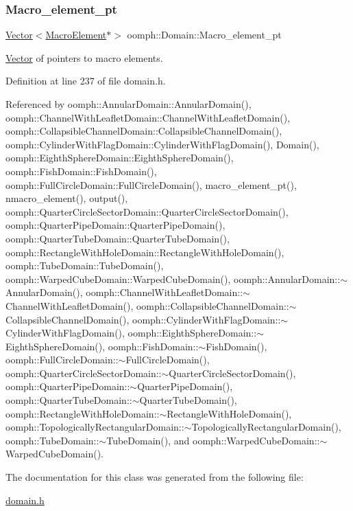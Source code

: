 \subsubsection{\texorpdfstring{Macro\+\_\+element\+\_\+pt}{Macro\_element\_pt}}
{\footnotesize\ttfamily \hyperlink{classoomph_1_1Vector}{Vector}$<$\hyperlink{classoomph_1_1MacroElement}{Macro\+Element}$\ast$$>$ oomph\+::\+Domain\+::\+Macro\+\_\+element\+\_\+pt\hspace{0.3cm}{\ttfamily [protected]}}



\hyperlink{classoomph_1_1Vector}{Vector} of pointers to macro elements. 



Definition at line 237 of file domain.\+h.



Referenced by oomph\+::\+Annular\+Domain\+::\+Annular\+Domain(), oomph\+::\+Channel\+With\+Leaflet\+Domain\+::\+Channel\+With\+Leaflet\+Domain(), oomph\+::\+Collapsible\+Channel\+Domain\+::\+Collapsible\+Channel\+Domain(), oomph\+::\+Cylinder\+With\+Flag\+Domain\+::\+Cylinder\+With\+Flag\+Domain(), Domain(), oomph\+::\+Eighth\+Sphere\+Domain\+::\+Eighth\+Sphere\+Domain(), oomph\+::\+Fish\+Domain\+::\+Fish\+Domain(), oomph\+::\+Full\+Circle\+Domain\+::\+Full\+Circle\+Domain(), macro\+\_\+element\+\_\+pt(), nmacro\+\_\+element(), output(), oomph\+::\+Quarter\+Circle\+Sector\+Domain\+::\+Quarter\+Circle\+Sector\+Domain(), oomph\+::\+Quarter\+Pipe\+Domain\+::\+Quarter\+Pipe\+Domain(), oomph\+::\+Quarter\+Tube\+Domain\+::\+Quarter\+Tube\+Domain(), oomph\+::\+Rectangle\+With\+Hole\+Domain\+::\+Rectangle\+With\+Hole\+Domain(), oomph\+::\+Tube\+Domain\+::\+Tube\+Domain(), oomph\+::\+Warped\+Cube\+Domain\+::\+Warped\+Cube\+Domain(), oomph\+::\+Annular\+Domain\+::$\sim$\+Annular\+Domain(), oomph\+::\+Channel\+With\+Leaflet\+Domain\+::$\sim$\+Channel\+With\+Leaflet\+Domain(), oomph\+::\+Collapsible\+Channel\+Domain\+::$\sim$\+Collapsible\+Channel\+Domain(), oomph\+::\+Cylinder\+With\+Flag\+Domain\+::$\sim$\+Cylinder\+With\+Flag\+Domain(), oomph\+::\+Eighth\+Sphere\+Domain\+::$\sim$\+Eighth\+Sphere\+Domain(), oomph\+::\+Fish\+Domain\+::$\sim$\+Fish\+Domain(), oomph\+::\+Full\+Circle\+Domain\+::$\sim$\+Full\+Circle\+Domain(), oomph\+::\+Quarter\+Circle\+Sector\+Domain\+::$\sim$\+Quarter\+Circle\+Sector\+Domain(), oomph\+::\+Quarter\+Pipe\+Domain\+::$\sim$\+Quarter\+Pipe\+Domain(), oomph\+::\+Quarter\+Tube\+Domain\+::$\sim$\+Quarter\+Tube\+Domain(), oomph\+::\+Rectangle\+With\+Hole\+Domain\+::$\sim$\+Rectangle\+With\+Hole\+Domain(), oomph\+::\+Topologically\+Rectangular\+Domain\+::$\sim$\+Topologically\+Rectangular\+Domain(), oomph\+::\+Tube\+Domain\+::$\sim$\+Tube\+Domain(), and oomph\+::\+Warped\+Cube\+Domain\+::$\sim$\+Warped\+Cube\+Domain().



The documentation for this class was generated from the following file\+:\begin{DoxyCompactItemize}
\item 
\hyperlink{domain_8h}{domain.\+h}\end{DoxyCompactItemize}
